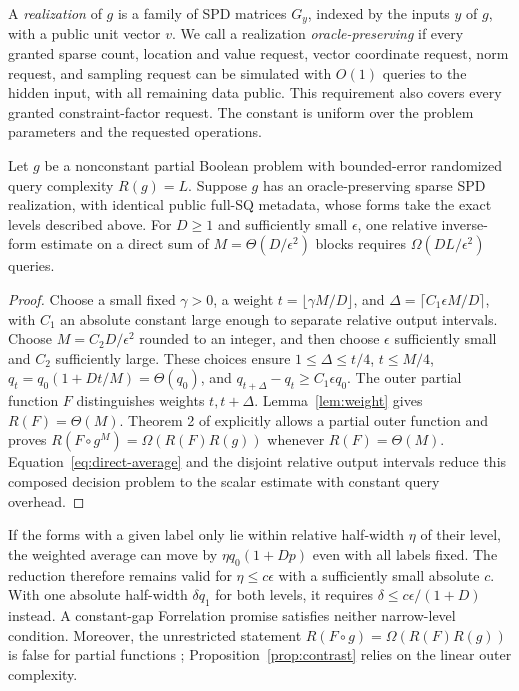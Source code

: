 A \emph{realization} of $g$ is a family of SPD matrices $G_y$, indexed
by the inputs $y$ of $g$, with a public unit vector $v$.
We call a realization \emph{oracle-preserving} if every granted sparse
count, location and value request, vector coordinate request, norm request,
and sampling request can be simulated with $O(1)$ queries to the hidden
input, with all remaining data public. This requirement also covers every
granted constraint-factor request. The constant is uniform over the
problem parameters and the requested operations.

\begin{proposition}\label{prop:contrast}
Let $g$ be a nonconstant partial Boolean problem with bounded-error randomized
query complexity $R(g)=L$. Suppose $g$ has an oracle-preserving sparse
SPD realization, with identical public full-SQ metadata, whose forms take
the exact levels described above.
For $D\geq1$ and
sufficiently small $\epsilon$, one relative inverse-form estimate on
a direct sum of $M=\Theta(D/\epsilon^2)$ blocks requires
$\Omega(DL/\epsilon^2)$ queries.
\end{proposition}
\begin{proof}
Choose a small fixed $\gamma>0$, a weight
$t=\lfloor\gamma M/D\rfloor$, and
$\Delta=\lceil C_1\epsilon M/D\rceil$, with $C_1$ an absolute
constant large enough to separate relative output intervals.
Choose $M=C_2D/\epsilon^2$ rounded to an integer, and then choose
$\epsilon$ sufficiently small and $C_2$ sufficiently large.
These choices ensure $1\leq\Delta\leq t/4$, $t\leq M/4$,
$q_t=q_0(1+Dt/M)=\Theta(q_0)$, and
$q_{t+\Delta}-q_t\geq C_1\epsilon q_0$.
The outer partial function $F$ distinguishes weights $t,t+\Delta$.
Lemma~\ref{lem:weight} gives $R(F)=\Theta(M)$.
Theorem 2 of \citet{ChakrabortyEtAl2023} explicitly allows a partial
outer function and proves $R(F\circ g^M)=\Omega(R(F)R(g))$ whenever
$R(F)=\Theta(M)$. Equation~\eqref{eq:direct-average} and the disjoint
relative output intervals reduce this composed decision problem to
the scalar estimate with constant query overhead.
\end{proof}

If the forms with a given label only lie within relative half-width
$\eta$ of their level, the weighted average can move by
$\eta q_0(1+Dp)$ even with all labels fixed. The reduction therefore
remains valid for $\eta\leq c\epsilon$ with a sufficiently small
absolute $c$. With one absolute half-width $\delta q_1$ for both levels,
it requires $\delta\leq c\epsilon/(1+D)$ instead. A constant-gap
Forrelation promise satisfies neither narrow-level condition.
Moreover, the unrestricted statement $R(F\circ g)=\Omega(R(F)R(g))$ is
false for partial functions \citep{BenDavidBlais2020};
Proposition~\ref{prop:contrast} relies on the linear outer complexity.

